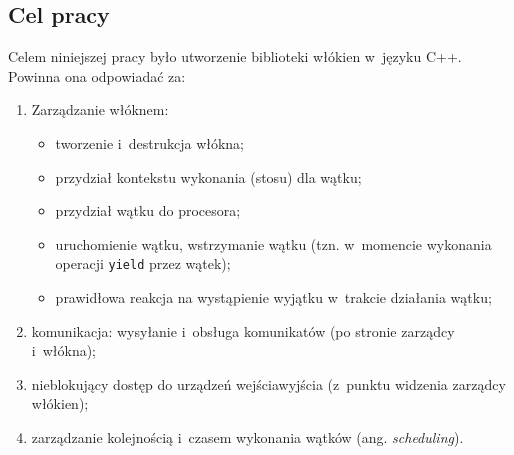 \documentclass[12pt]{mwart}
\begin{document}
\subsection{Cel pracy}
\indent
  Celem niniejszej pracy było utworzenie biblioteki włókien w~języku C++.
	Powinna ona odpowiadać za:
	\begin{enumerate}
		\item Zarządzanie włóknem:
		\begin{itemize}
			\item tworzenie i~destrukcja włókna;
			\item przydział kontekstu wykonania (stosu) dla wątku;
			\item przydział wątku do procesora;
			\item uruchomienie wątku, wstrzymanie wątku (tzn. w~momencie wykonania operacji {\tt yield} przez wątek);
			\item prawidłowa reakcja na wystąpienie wyjątku w~trakcie działania wątku;
		\end{itemize}
		\item komunikacja: wysyłanie i~obsługa komunikatów (po stronie zarządcy i~włókna);
		\item nieblokujący dostęp do  urządzeń wejścia\dywiz wyjścia (z~punktu widzenia zarządcy włókien);
		\item zarządzanie kolejnością i~czasem wykonania wątków (ang. \emph{scheduling}).
	\end{enumerate}
\par
%
\end{document}
